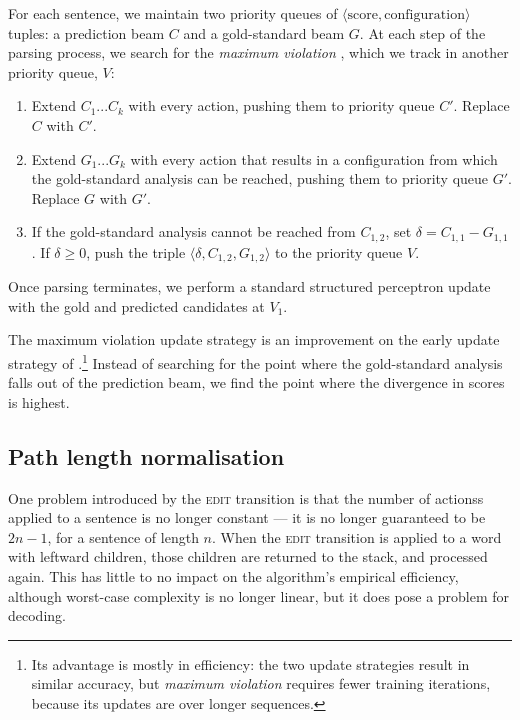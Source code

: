 \documentclass[11pt,letterpaper]{article}
\begin{document}
For each sentence, we maintain two priority queues of
$\langle \mathrm{score}, \mathrm{configuration} \rangle$ tuples: a prediction
beam $C$ and a gold-standard beam $G$.
At each step of the parsing process, we search for the \emph{maximum violation}
\citep{huang:12}, which we track in another priority queue, $V$:

\begin{enumerate}
\itemsep0em
\item Extend $C_1...C_k$ with every action, pushing them to
      priority queue $C'$. Replace $C$ with $C'$.
\item Extend $G_1...G_k$ with every action that results in a
      configuration from which the gold-standard analysis can be reached, pushing
      them to priority queue $G'$. Replace $G$ with $G'$.
  \item If the gold-standard analysis cannot be reached from $C_{1,2}$, 
    set $\delta = C_{1,1} - G_{1,1}$. If $\delta \ge 0$, push the triple
    $\langle \delta, C_{1,2}, G_{1,2} \rangle$ to the priority queue $V$.
\end{enumerate}

Once parsing terminates, we perform a standard structured perceptron update
with the gold and predicted candidates at $V_1$.

The maximum violation update strategy is an improvement on the early update
strategy of \citet{collins:02}.\footnote{Its advantage is mostly in efficiency:
the two update strategies result in similar accuracy, but \emph{maximum violation}
requires fewer training iterations, because its updates are over longer sequences.}
Instead of searching for the point where the
gold-standard analysis falls out of the prediction beam, we find the point
where the divergence in scores is highest.



\subsection{Path length normalisation}

One problem introduced by the \textsc{edit} transition is that the number of
actionss applied to a sentence is no longer constant --- it is no longer guaranteed
to be $2n-1$, for a sentence of length $n$. When the \textsc{edit} transition is
applied to a word with leftward children, those children are returned to the stack,
and processed again.  This has little to no impact on the algorithm's empirical
efficiency, although worst-case complexity is no longer linear, but it does
pose a problem for decoding.
\end{document}
